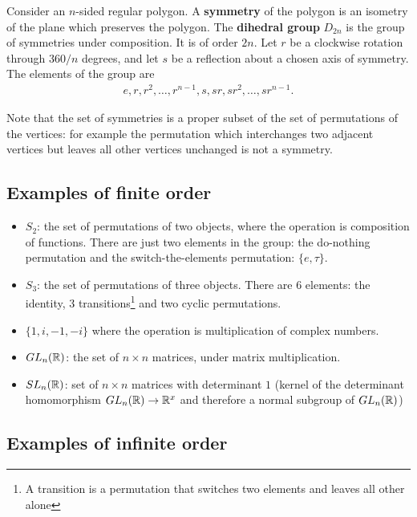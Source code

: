 Consider an $n$-sided regular polygon. A \textbf{symmetry} of the polygon is an
isometry of the plane which preserves the polygon. The \textbf{dihedral group}
$D_{2n}$ is the group of symmetries under composition. It is of order $2n$. Let
$r$ be a clockwise rotation through $360/n$ degrees, and let $s$ be a
reflection about a chosen axis of symmetry. The elements of the group are
\begin{align*}
  e, r, r^2, \ldots, r^{n-1}, s, sr, sr^2, \ldots, sr^{n-1}.
\end{align*}

Note that the set of symmetries is a proper subset of the set of permutations
of the vertices: for example the permutation which interchanges two adjacent
vertices but leaves all other vertices unchanged is not a symmetry.


\subsection{Examples of finite order}

\begin{itemize}
\item $S_2$: the set of permutations of two objects, where the operation is
  composition of functions.  There are just two elements in the group: the
  do-nothing permutation and the switch-the-elements permutation: $\{e,
  \tau\}$.

\item $S_3$: the set of permutations of three objects. There are 6 elements: the
  identity, 3 transitions\footnote{A transition is a permutation that switches two
  elements and leaves all other alone} and two cyclic permutations.

\item $\{1, i, -1, -i\}$ where the operation is multiplication of complex numbers.

\item $GL_n(\mathbb{R})$: the set of $n \times n$ matrices, under matrix multiplication.

\item $SL_n(\mathbb{R})$: set of $n \times n$ matrices with determinant $1$ (kernel of the
  determinant homomorphism $GL_n(\mathbb{R}) \rightarrow \mathbb{R}^x$ and therefore a normal
  subgroup of $GL_n(\mathbb{R})$)
\end{itemize}

\subsection{Examples of infinite order}

